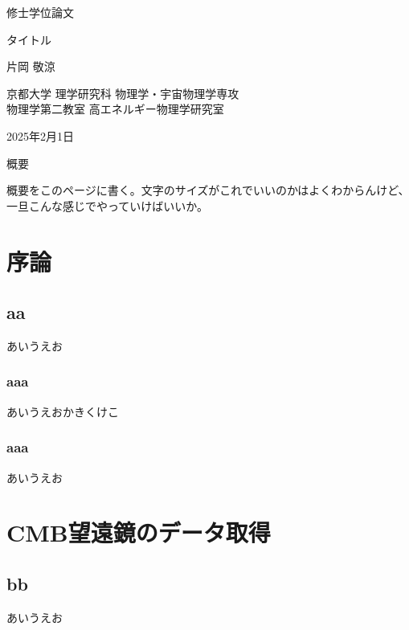 \documentclass[11pt]{jsreport}
\begin{document}
\begin{titlepage}
  \begin{center}
    {\Huge 修士学位論文}

    \vspace{50truept}

    {\Huge タイトル}

    \vspace{80truept}

    {\LARGE 片岡 敬涼}

    \vspace{50truept}

    {\LARGE 京都大学 理学研究科 物理学・宇宙物理学専攻 \\ 物理学第二教室 高エネルギー物理学研究室}

    \vspace{100truept}

    {\LARGE 2025年2月1日}

  \end{center}
\end{titlepage}

\clearpage

\begin{center}
  {\Large 概要}
\end{center}

概要をこのページに書く。文字のサイズがこれでいいのかはよくわからんけど、一旦こんな感じでやっていけばいいか。

\clearpage

\tableofcontents

\chapter{序論}
\section{aa}
あいうえお
\subsection{aaa}
あいうえおかきくけこ
\subsection{aaa}
あいうえお

\chapter{CMB望遠鏡のデータ取得}
\section{bb}
あいうえお
\end{document}
